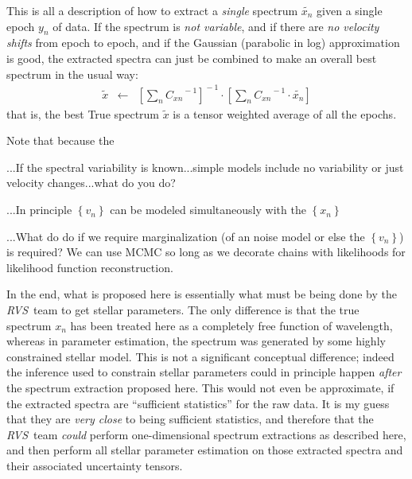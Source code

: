 \documentclass[11pt]{article}
\newcommand{\setof}[1]{\left\{{#1}\right\}}
\newcommand{\inverse}[1]{{#1}^{\!-1}}
\newcommand{\best}[1]{\widetilde{#1}}
\newcommand{\instrument}[1]{\textsl{#1}}
\newcommand{\RVS}{\instrument{RVS}}
\begin{document}
This is all a description of how to extract a \emph{single} spectrum
$\best{x_n}$ given a single epoch $y_n$ of data.
If the spectrum is \emph{not variable}, and if there are \emph{no velocity shifts}
from epoch to epoch, and if the Gaussian (parabolic in log)
approximation is good, the extracted spectra can just be combined to
make an overall best spectrum in the usual way:
\begin{eqnarray}
\best{x} &\leftarrow& 
\inverse{\left[\sum_n \inverse{C_{xn}}\right]}\cdot\left[\sum_n \inverse{C_{xn}}\cdot \best{x_n}\right]
\end{eqnarray}
that is, the best True spectrum $\best{x}$ is a tensor weighted
average of all the epochs.

Note that because the 

...If the spectral variability is known...simple models include no
variability or just velocity changes...what do you do?

...In principle $\setof{v_n}$ can be modeled simultaneously with the
$\setof{x_n}$

...What do do if we require marginalization (of an noise model or else
the $\setof{v_n}$) is required?  We can use MCMC so long as we
decorate chains with likelihoods for likelihood function
reconstruction.

In the end, what is proposed here is essentially what must be being
done by the \RVS\ team to get stellar parameters.
The only difference is that the true spectrum $x_n$ has been treated
here as a completely free function of wavelength, whereas in parameter
estimation, the spectrum was generated by some highly constrained
stellar model.
This is not a significant conceptual difference; indeed the inference
used to constrain stellar parameters could in principle happen
\emph{after} the spectrum extraction proposed here.
This would not even be approximate, if the extracted spectra are
``sufficient statistics'' for the raw data.
It is my guess that they are \emph{very close} to being sufficient
statistics, and therefore that the \RVS\ team \emph{could} perform
one-dimensional spectrum extractions as described here, and then
perform all stellar parameter estimation on those extracted spectra
and their associated uncertainty tensors.
\end{document}
